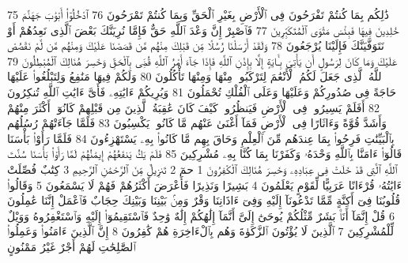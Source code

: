 {\tiny\colorbox{cl_aya}{75}} ذَٰلِكُم بِمَا كُنتُمْ تَفْرَحُونَ فِى ٱلْأَرْضِ بِغَيْرِ ٱلْحَقِّ وَبِمَا كُنتُمْ تَمْرَحُونَ
{\tiny\colorbox{cl_aya}{76}} ٱدْخُلُوٓا۟ أَبْوَٰبَ جَهَنَّمَ خَٰلِدِينَ فِيهَا فَبِئْسَ مَثْوَى ٱلْمُتَكَبِّرِينَ
{\tiny\colorbox{cl_aya}{77}} فَٱصْبِرْ إِنَّ وَعْدَ ٱللَّهِ حَقٌّ فَإِمَّا نُرِيَنَّكَ بَعْضَ ٱلَّذِى نَعِدُهُمْ أَوْ نَتَوَفَّيَنَّكَ فَإِلَيْنَا يُرْجَعُونَ
{\tiny\colorbox{cl_aya}{78}} وَلَقَدْ أَرْسَلْنَا رُسُلًا مِّن قَبْلِكَ مِنْهُم مَّن قَصَصْنَا عَلَيْكَ وَمِنْهُم مَّن لَّمْ نَقْصُصْ عَلَيْكَ وَمَا كَانَ لِرَسُولٍ أَن يَأْتِىَ بِـَٔايَةٍ إِلَّا بِإِذْنِ ٱللَّهِ فَإِذَا جَآءَ أَمْرُ ٱللَّهِ قُضِىَ بِٱلْحَقِّ وَخَسِرَ هُنَالِكَ ٱلْمُبْطِلُونَ
{\tiny\colorbox{cl_aya}{79}} ٱللَّهُ ٱلَّذِى جَعَلَ لَكُمُ ٱلْأَنْعَٰمَ لِتَرْكَبُوا۟ مِنْهَا وَمِنْهَا تَأْكُلُونَ
{\tiny\colorbox{cl_aya}{80}} وَلَكُمْ فِيهَا مَنَٰفِعُ وَلِتَبْلُغُوا۟ عَلَيْهَا حَاجَةً فِى صُدُورِكُمْ وَعَلَيْهَا وَعَلَى ٱلْفُلْكِ تُحْمَلُونَ
{\tiny\colorbox{cl_aya}{81}} وَيُرِيكُمْ ءَايَٰتِهِۦ فَأَىَّ ءَايَٰتِ ٱللَّهِ تُنكِرُونَ
{\tiny\colorbox{cl_aya}{82}} أَفَلَمْ يَسِيرُوا۟ فِى ٱلْأَرْضِ فَيَنظُرُوا۟ كَيْفَ كَانَ عَٰقِبَةُ ٱلَّذِينَ مِن قَبْلِهِمْ كَانُوٓا۟ أَكْثَرَ مِنْهُمْ وَأَشَدَّ قُوَّةً وَءَاثَارًا فِى ٱلْأَرْضِ فَمَآ أَغْنَىٰ عَنْهُم مَّا كَانُوا۟ يَكْسِبُونَ
{\tiny\colorbox{cl_aya}{83}} فَلَمَّا جَآءَتْهُمْ رُسُلُهُم بِٱلْبَيِّنَٰتِ فَرِحُوا۟ بِمَا عِندَهُم مِّنَ ٱلْعِلْمِ وَحَاقَ بِهِم مَّا كَانُوا۟ بِهِۦ يَسْتَهْزِءُونَ
{\tiny\colorbox{cl_aya}{84}} فَلَمَّا رَأَوْا۟ بَأْسَنَا قَالُوٓا۟ ءَامَنَّا بِٱللَّهِ وَحْدَهُۥ وَكَفَرْنَا بِمَا كُنَّا بِهِۦ مُشْرِكِينَ
{\tiny\colorbox{cl_aya}{85}} فَلَمْ يَكُ يَنفَعُهُمْ إِيمَٰنُهُمْ لَمَّا رَأَوْا۟ بَأْسَنَا سُنَّتَ ٱللَّهِ ٱلَّتِى قَدْ خَلَتْ فِى عِبَادِهِۦ وَخَسِرَ هُنَالِكَ ٱلْكَٰفِرُونَ
{\tiny\colorbox{cl_aya}{1}} حمٓ
{\tiny\colorbox{cl_aya}{2}} تَنزِيلٌ مِّنَ ٱلرَّحْمَٰنِ ٱلرَّحِيمِ
{\tiny\colorbox{cl_aya}{3}} كِتَٰبٌ فُصِّلَتْ ءَايَٰتُهُۥ قُرْءَانًا عَرَبِيًّا لِّقَوْمٍ يَعْلَمُونَ
{\tiny\colorbox{cl_aya}{4}} بَشِيرًا وَنَذِيرًا فَأَعْرَضَ أَكْثَرُهُمْ فَهُمْ لَا يَسْمَعُونَ
{\tiny\colorbox{cl_aya}{5}} وَقَالُوا۟ قُلُوبُنَا فِىٓ أَكِنَّةٍ مِّمَّا تَدْعُونَآ إِلَيْهِ وَفِىٓ ءَاذَانِنَا وَقْرٌ وَمِنۢ بَيْنِنَا وَبَيْنِكَ حِجَابٌ فَٱعْمَلْ إِنَّنَا عَٰمِلُونَ
{\tiny\colorbox{cl_aya}{6}} قُلْ إِنَّمَآ أَنَا۠ بَشَرٌ مِّثْلُكُمْ يُوحَىٰٓ إِلَىَّ أَنَّمَآ إِلَٰهُكُمْ إِلَٰهٌ وَٰحِدٌ فَٱسْتَقِيمُوٓا۟ إِلَيْهِ وَٱسْتَغْفِرُوهُ وَوَيْلٌ لِّلْمُشْرِكِينَ
{\tiny\colorbox{cl_aya}{7}} ٱلَّذِينَ لَا يُؤْتُونَ ٱلزَّكَوٰةَ وَهُم بِٱلْءَاخِرَةِ هُمْ كَٰفِرُونَ
{\tiny\colorbox{cl_aya}{8}} إِنَّ ٱلَّذِينَ ءَامَنُوا۟ وَعَمِلُوا۟ ٱلصَّٰلِحَٰتِ لَهُمْ أَجْرٌ غَيْرُ مَمْنُونٍ
